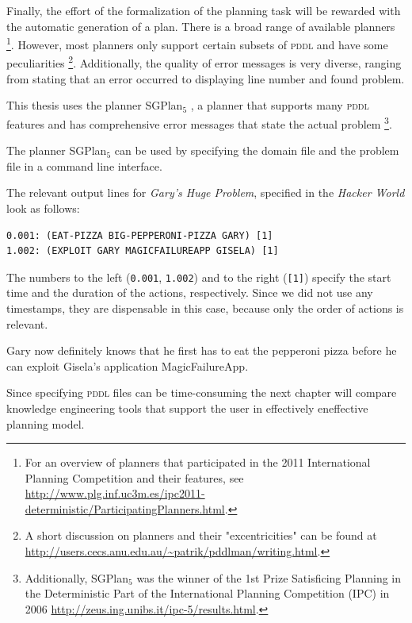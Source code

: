 \documentclass[a4paper,12pt]{report}
\newcommand{\pddl}{\textsc{pddl}\xspace}
\begin{document}
Finally, the effort of the formalization of the planning task will be
rewarded with the automatic generation of a plan. There is a broad
range of available planners \footnote{For an overview of planners that participated in the 2011
International Planning Competition and their features, see
\url{http://www.plg.inf.uc3m.es/ipc2011-deterministic/ParticipatingPlanners.html}.}. However, most planners only
support certain subsets of \pddl and have some
peculiarities \footnote{A short discussion on planners and their "excentricities" can
be found at \url{http://users.cecs.anu.edu.au/~patrik/pddlman/writing.html}.}. Additionally, the quality of error messages is
very diverse, ranging from stating that an error occurred to
displaying line number and found problem.

This thesis uses the planner SGPlan\(_{\text{5}}\) \cite{hsu2008sgplan}, a planner
that supports many \textsc{pddl} features and has comprehensive
error messages that state the actual problem \footnote{Additionally, SGPlan\(_{\text{5}}\) was the winner of the 1st Prize
Satisficing Planning in the Deterministic Part of the International
Planning Competition (IPC) in 2006
\url{http://zeus.ing.unibs.it/ipc-5/results.html}.}.

The planner SGPlan\(_{\text{5}}\) can be used by specifying the domain file and
the problem file in a command line interface.

The relevant output lines for \emph{Gary's Huge Problem}, specified in the
\emph{Hacker World} look as follows:
\vspace*{0.2cm}

\begin{verbatim}
0.001: (EAT-PIZZA BIG-PEPPERONI-PIZZA GARY) [1]
1.002: (EXPLOIT GARY MAGICFAILUREAPP GISELA) [1]
\end{verbatim}

The numbers to the left (\texttt{0.001}, \texttt{1.002}) and to the right (\texttt{[1]})
specify the start time and the duration of the actions, respectively.
Since we did not use any timestamps, they are dispensable in this
case, because only the order of actions is relevant.

Gary now definitely knows that he first has to eat the pepperoni pizza
before he can exploit Gisela's application MagicFailureApp.

Since specifying \textsc{pddl} files can be time-consuming the next
chapter will compare knowledge engineering tools that support the user
in effectively eneffective planning model.
\end{document}
